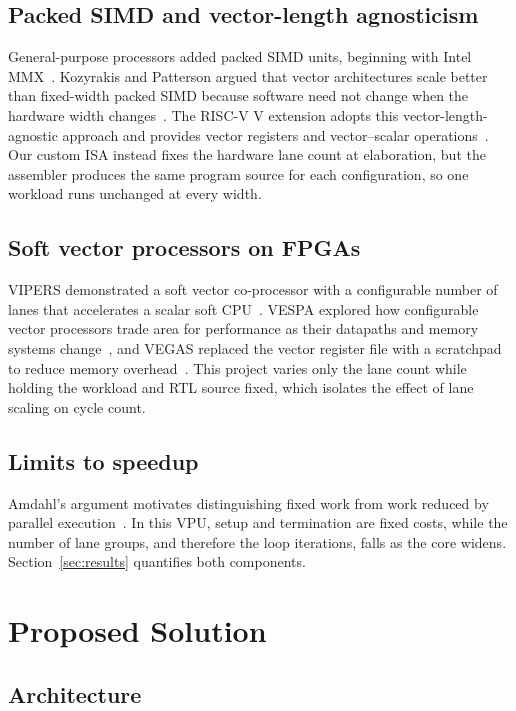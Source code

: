 \documentclass[conference]{IEEEtran}
\begin{document}
\subsection{Packed SIMD and vector-length agnosticism}
General-purpose processors added packed SIMD units, beginning with Intel
MMX~\cite{peleg1996mmx}. Kozyrakis and Patterson argued that vector
architectures scale better than fixed-width packed SIMD because software
need not change when the hardware width changes~\cite{kozyrakis2003scalable}.
The RISC-V V extension adopts this vector-length-agnostic approach and
provides vector registers and vector--scalar operations~\cite{riscvvector}.
Our custom ISA instead fixes the hardware lane count at elaboration, but the
assembler produces the same program source for each configuration, so one
workload runs unchanged at every width.

\subsection{Soft vector processors on FPGAs}
VIPERS demonstrated a soft vector co-processor with a configurable number of
lanes that accelerates a scalar soft CPU~\cite{yu2008vipers}. VESPA explored
how configurable vector processors trade area for performance as their
datapaths and memory systems change~\cite{yiannacouras2008vespa}, and VEGAS
replaced the vector register file with a scratchpad to reduce memory
overhead~\cite{chou2011vegas}. This project varies only the lane count while
holding the workload and RTL source fixed, which isolates the effect of
lane scaling on cycle count.

\subsection{Limits to speedup}
Amdahl's argument motivates distinguishing fixed work from work reduced by
parallel execution~\cite{amdahl1967validity}. In this VPU, setup and
termination are fixed costs, while the number of lane groups, and therefore
the loop iterations, falls as the core widens. Section~\ref{sec:results}
quantifies both components.

\section{Proposed Solution}

\subsection{Architecture}
\end{document}
